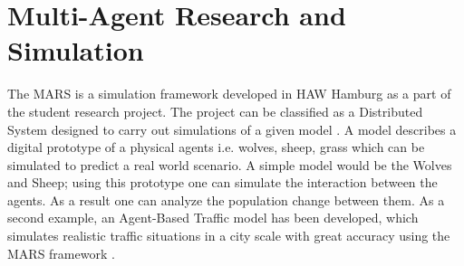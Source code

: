 
\section{Multi-Agent Research and Simulation}
        \label{section:MARS}
        The MARS is a simulation framework developed 
        in HAW Hamburg as a part of the student research project. The project can be classified as a
        Distributed System \cite{DistributedSystems} designed to carry out simulations of a given model 
        \cite{HAWHamburgMARS}. 
        A model describes a digital prototype of a physical agents i.e. wolves, sheep, grass 
        which can be simulated to predict a real world scenario. A simple model would
        be the Wolves and Sheep; using this prototype one can simulate the interaction between the agents. 
        As a result one can analyze the population change between them. As a second example, an Agent-Based Traffic
        model has been developed, which simulates realistic traffic situations in a city scale with great accuracy 
        using the MARS framework \cite{TrafficModel}.

        \par
